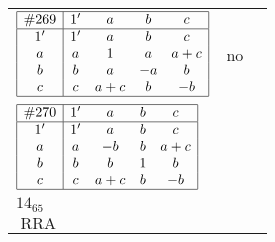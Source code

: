 \documentclass[12pt]{article}
\newcommand\RRA{\operatorname{RRA}}
\newcommand{\join}{\mathbin{+}}%
\newcommand{\id}{{1'}}%
\renewcommand{\top}{1}%
\begin{document}
\begin{center}
\begin{longtable}{l|c|c}
$
\begin{array}{|c|cccc|} \hline
\#269 & \id & a & b & c \\ \hline
\id & \id & a & b & c \\
a & a & \top & a & a \join c \\
b & b & a & -a & b \\
c & c & a \join c & b & -b \\ \hline
\end{array}
$
 & no  
 & \adjustbox{valign=c, max height=1.6cm}{$
\left[ \begin{array}{cccccccc}
\id & a & a & b & c & a & b & c \\ 
a & \id & a & a & a & c & a & a \\ 
a & a & \id & a & a & c & a & a \\ 
b & a & a & \id & b & a & b & b \\ 
c & a & a & b & \id & a & b & c \\ 
a & c & c & a & a & \id & a & a \\ 
b & a & a & b & b & a & \id & b \\ 
c & a & a & b & c & a & b & \id
\end{array}\right]
$}     \\[15mm]

$
\begin{array}{|c|cccc|} \hline
\#270 & \id & a & b & c \\ \hline
\id & \id & a & b & c \\
a & a & -b & b & a \join c \\
b & b & b & \top & b \\
c & c & a \join c & b & -b \\ \hline
\end{array}
$
 & \begin{tabular}{c} yes \\ $14_{65}$ \\ $\RRA$ \end{tabular} 
 & \adjustbox{valign=c, max height=1.6cm}{$
\left[ \begin{array}{ccccccc}
\id & a & a & c & b & b & c \\ 
a & \id & a & a & b & b & c \\ 
a & a & \id & c & b & b & c \\ 
c & a & c & \id & b & b & c \\ 
b & b & b & b & \id & b & b \\ 
b & b & b & b & b & \id & b \\ 
c & c & c & c & b & b & \id
\end{array}\right]
$}      \\[15mm]


\end{longtable}
\end{center}
\end{document}
